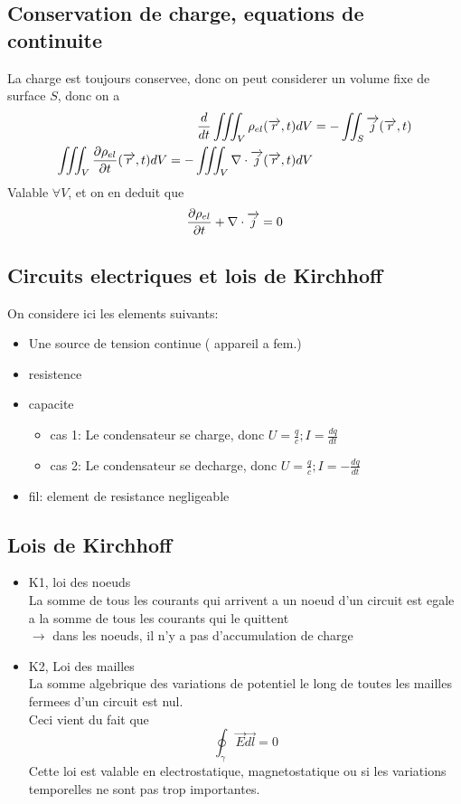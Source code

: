 \documentclass[../main.tex]{subfiles}
\begin{document}
\subsection{Conservation de charge, equations de continuite}
La charge est toujours conservee, donc on peut considerer un volume fixe de surface $S$, donc on a
\begin{align*}
	\frac{d}{dt} \iiint_V \rho_{el}  ( \overrightarrow{r},t) dV &= - \iint_S \overrightarrow{j}( \overrightarrow{r},t) \\
	\iiint_V \frac{\partial \rho_{el} }{\partial t} ( \overrightarrow{r},t) dV = - \iiint_V \nabla \cdot \overrightarrow{j}( \overrightarrow{r},t) dV
\end{align*}
Valable $\forall V$, et on en deduit que
\[ 
\frac{\partial \rho_{el}}{\partial t} + \nabla \cdot \overrightarrow{j} =0
\]
\subsection{Circuits electriques et lois de Kirchhoff}
On considere ici les elements suivants:
\begin{itemize}
	\item Une source de tension continue ( appareil a fem.) 
	\item resistence
	\item capacite 
		\begin{itemize}
		\item cas 1: Le condensateur se charge, donc $U= \frac{q}{c}; I = \frac{dq }{dt}$
		\item cas 2: Le condensateur se decharge, donc $U= \frac{q}{c}; I =- \frac{dq }{dt}$
		\end{itemize}

	\item fil: element de resistance negligeable
		
\end{itemize}
\subsection{Lois de Kirchhoff}
\begin{itemize}
\item K1, loi des noeuds\\
	La somme de tous les courants qui arrivent a un noeud d'un circuit est egale a la somme de tous les courants qui le quittent \\
	$\to $ dans les noeuds, il n'y a pas d'accumulation de charge
\item K2, Loi des mailles \\
	La somme algebrique des variations  de potentiel le long de toutes les mailles fermees d'un circuit est nul.\\
	Ceci vient du fait que
	\[ 
\oint _\gamma \vec{E} \vec{dl} =0	
	\]
Cette loi est valable en electrostatique, magnetostatique ou si les variations temporelles ne sont pas trop importantes.	
\end{itemize}
\end{document}
